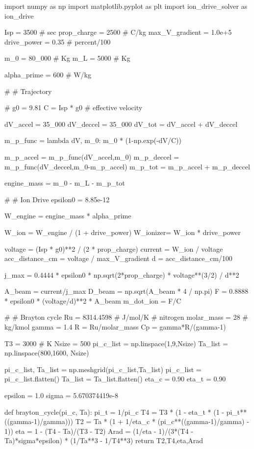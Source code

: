 \documentclass[journal ]{new-aiaa}
\begin{document}
\begin{python}
    import numpy as np
    import matplotlib.pyplot as plt
    import ion_drive_solver as ion_drive

    Isp = 3500 # sec
    prop_charge = 2500 # C/kg
    max_V_gradient = 1.0e+5
    drive_power = 0.35 # percent/100

    m_0 = 80_000 # Kg
    m_L = 5000 # Kg

    alpha_prime = 600 # W/kg

    # # Trajectory

    # %
    g0 = 9.81
    C = Isp * g0 # effective velocity

    dV_accel = 35_000
    dV_deccel = 35_000
    dV_tot = dV_accel + dV_deccel



    m_p_func = lambda dV, m_0: m_0 * (1-np.exp(-dV/C))

    m_p_accel = m_p_func(dV_accel,m_0)
    m_p_deccel = m_p_func(dV_deccel,m_0-m_p_accel)
    m_p_tot = m_p_accel + m_p_deccel

    engine_mass = m_0 - m_L - m_p_tot

    # # Ion Drive
    epsilon0 = 8.85e-12

    W_engine = engine_mass * alpha_prime

    W_ion =  W_engine / (1 + drive_power)
    W_ionizer= W_ion * drive_power

    voltage = (Isp * g0)**2 / (2 * prop_charge)
    current = W_ion / voltage
    acc_distance_cm = voltage / max_V_gradient
    d = acc_distance_cm/100

    j_max = 0.4444 * epsilon0 * np.sqrt(2*prop_charge) * voltage**(3/2) / d**2

    A_beam = current/j_max
    D_beam = np.sqrt(A_beam * 4 / np.pi)
    F = 0.8888 * epsilon0 * (voltage/d)**2 * A_beam
    m_dot_ion = F/C

    # # Brayton cycle
    Ru = 8314.4598 # J/mol/K
    # nitrogen
    molar_mass = 28 # kg/kmol
    gamma = 1.4
    R = Ru/molar_mass
    Cp = gamma*R/(gamma-1)

    T3 = 3000 # K
    Nsize = 500
    pi_c_list = np.linspace(1,9,Nsize)
    Ta_list = np.linspace(800,1600, Nsize)

    pi_c_list, Ta_list = np.meshgrid(pi_c_list,Ta_list)
    pi_c_list = pi_c_list.flatten()
    Ta_list = Ta_list.flatten()
    eta_c = 0.90
    eta_t = 0.90

    epsilon = 1.0
    sigma = 5.670374419e-8

    def brayton_cycle(pi_c, Ta):
        pi_t = 1/pi_c
        T4 = T3 * (1 - eta_t * (1 - pi_t**((gamma-1)/gamma)))
        T2 = Ta * (1 + 1/eta_c * (pi_c**((gamma-1)/gamma) - 1))
        eta = 1 - (T4 - Ta)/(T3 - T2)
        Arad = (1/eta - 1)/(3*(T4 - Ta)*sigma*epsilon) * (1/Ta**3 - 1/T4**3)
        return T2,T4,eta,Arad


\end{python}
\end{document}
